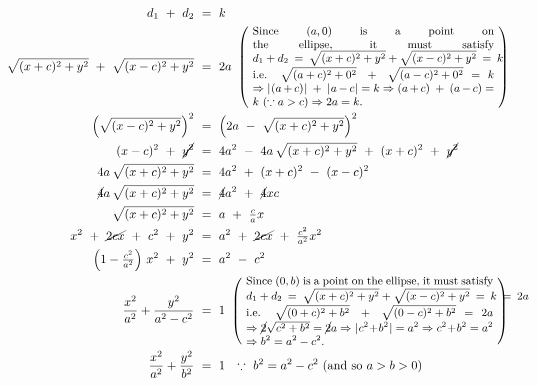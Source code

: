 \begin{align*}
d_1 ~+~ d_2 ~&=~ k\\
\sqrt{(x+c)^2 + y^2} ~+~ \sqrt{(x-c)^2 + y^2} ~&=~ 2a
~\left(~
\begin{minipage}[c]{0.567\linewidth}
  \small
  Since $(a,0)$ is a point on the ellipse, it must satisfy $d_1 ~+~
  d_2 ~=~ \sqrt{(x+c)^2 + y^2} ~+~ \sqrt{(x-c)^2 + y^2} ~=~ k$
  i.e. $\sqrt{(a+c)^2 + 0^2} ~+~ \sqrt{(a-c)^2 + 0^2} = k
  \allowbreak\Rightarrow \abs{(a+c)} ~+~ \abs{a-c} = k
  \allowbreak\Rightarrow (a+c) ~+~ (a-c) = k ~(\because a > c)
  \allowbreak\Rightarrow 2a = k$.
\end{minipage}
~\right)\\
\left(\sqrt{(x-c)^2 + y^2}\right)^2 ~&=~ \left(2a ~-~ \sqrt{(x+c)^2 + y^2}\right)^2\\
(x-c)^2 ~+~ \cancel{y^2} ~&=~ 4a^2 ~-~ 4a\,\sqrt{(x+c)^2 + y^2} ~+~ (x+c)^2 ~+~ \cancel{y^2}\\
4a\,\sqrt{(x+c)^2 + y^2} ~&=~ 4a^2 ~+~ (x+c)^2 ~-~ (x-c)^2\\
\cancel{4}a\,\sqrt{(x+c)^2 + y^2} ~&=~ \cancel{4}a^2 ~+~ \cancel{4}xc\\
\sqrt{(x+c)^2 + y^2} ~&=~ a ~+~ \tfrac{c}{a}x\\
x^2 ~+~ \cancel{2cx} ~+~ c^2 ~+~ y^2 ~&=~ a^2 ~+~ \cancel{2cx} ~+~ \tfrac{c^2}{a^2}x^2\\
\left(1 - \tfrac{c^2}{a^2}\right)\,x^2 ~+~ y^2 ~&=~ a^2 ~-~ c^2\\
\frac{x^2}{a^2} + \frac{y^2}{a^2 - c^2} ~&=~ 1
~\left(~
\begin{minipage}[c]{0.58\linewidth}
  \small
  Since $(0,b)$ is a point on the ellipse, it must satisfy $d_1 ~+~
  d_2 ~=~ \sqrt{(x+c)^2 + y^2} ~+~ \sqrt{(x-c)^2 + y^2} ~=~ k ~=~ 2a$
  i.e. $ \sqrt{(0+c)^2 + b^2} ~+~ \sqrt{(0-c)^2 + b^2} = 2a
  \allowbreak\Rightarrow \cancel{2}\sqrt{c^2 + b^2} = \cancel{2}a
  \allowbreak\Rightarrow \abs{c^2 + b^2} = a^2
  \allowbreak\Rightarrow c^2 + b^2 = a^2
  \allowbreak\Rightarrow b^2 = a^2 - c^2$.
\end{minipage}
~\right)\\
\frac{x^2}{a^2} + \frac{y^2}{b^2} ~&=~ 1
\quad\text{$\because~b^2 = a^2 - c^2$ (and so $a > b > 0$)}\quad\checkmark
\end{align*}
\newpage
\piccaption[]{\label{fig:ellipab}}
